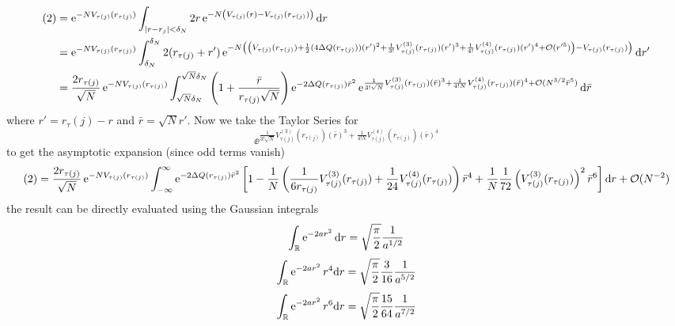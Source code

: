 \begin{align}
  (2) & = \operatorname{e}^{-N V_{\tau(j)}(r_{\tau(j)})} \int_{|r - r_j| < \delta_N} 2r \operatorname{e}^{-N \left( V_{\tau(j)}(r) - V_{\tau(j)}(r_{\tau(j)}) \right)} \mathrm{d} r \\
	& =  \operatorname{e}^{-N V_{\tau(j)}(r_{\tau(j)})} \int_{\delta_N}^{\delta_N} 2(r_{\tau(j)} + r') \operatorname{e}^{-N \left( \left(V_{\tau(j)}(r_{\tau(j)}) + \frac{1}{2}(4 \Delta Q(r_{\tau(j)})) (r')^2 + \frac{1}{3!} V^{(3)}_{\tau(j)}(r_{\tau(j)}) (r')^3 + \frac{1}{4!} V^{(4)}_{\tau(j)}(r_{\tau(j)}) (r')^4 + \mathcal{O}(r'^5) \right) - V_{\tau(j)}(r_{\tau(j)}) \right)} \mathrm{d} r' \\
	&  = \frac{2 r_{\tau(j)}}{\sqrt{N}} \operatorname{e}^{-N V_{\tau(j)}(r_{\tau(j)})} \int_{\sqrt{N} \delta_N}^{\sqrt{N}\delta_N}\left(1 + \frac{\bar{r}}{r_{\tau(j)} \sqrt{N}}\right) \operatorname{e}^{-2\Delta Q(r_{\tau(j)}) \bar{r}^2} \operatorname{e}^{\frac{1}{3! \sqrt{N}} V^{(3)}_{\tau(j)}(r_{\tau(j)}) (\bar{r})^3 + \frac{1}{4! N} V^{(4)}_{\tau(j)}(r_{\tau(j)}) (\bar{r})^4 + \mathcal{O}(N^{3/2} \bar{r}^5)} \mathrm{d} \bar{r}
\end{align}
where $r' = r_\tau(j) - r$ and $\bar{r} =  \sqrt{N}r'$. Now we take the Taylor Series for 
\begin{equation}
	\ee^{\frac{1}{3! \sqrt{N}} V^{(3)}_{\tau(j)}(r_{\tau(j)}) (\bar{r})^3 + \frac{1}{4! N} V^{(4)}_{\tau(j)}(r_{\tau(j)}) (\bar{r})^4}
\end{equation}
to get the asymptotic expansion (since odd terms vanish)
\begin{equation}
	(2) = \frac{2 r_{\tau(j)}}{\sqrt{N}} \operatorname{e}^{-N V_{\tau(j)}(r_{\tau(j)})} \int_{-\infty}^{\infty} \operatorname{e}^{-2\Delta Q(r_{\tau(j)}) \bar{r}^2} \left[ 1- \frac{1}{N} \left( \frac{1}{6 r_{\tau(j)}} V^{(3)}_{\tau(j)}(r_{\tau(j)}) + \frac{1}{24} V^{(4)}_{\tau(j)}(r_{\tau(j)}) \right) \bar{r}^4 + \frac{1}{N} \frac{1}{72} \left(V^{(3)}_{\tau(j)}(r_{\tau(j)}) \right)^2 \bar{r}^6 \right] \mathrm{d} r + \mathcal{O}(N^{-2})
\end{equation}
the result can be directly evaluated using the Gaussian integrals
\begin{equation}
	\int_{\mathbb{R}} \operatorname{e}^{-2ar^2} \mathrm{d} r = \sqrt{\frac{\pi}{2}} \frac{1}{a^{1/2}}
\end{equation}
\begin{equation}
	\int_{\mathbb{R}} \operatorname{e}^{-2ar^2} r^4 \mathrm{d} r = \sqrt{\frac{\pi}{2}} \frac{3}{16} \frac{1}{a^{5/2}}
\end{equation}
\begin{equation}
	\int_{\mathbb{R}} \operatorname{e}^{-2ar^2} r^6 \mathrm{d} r = \sqrt{\frac{\pi}{2}} \frac{15}{64} \frac{1}{a^{7/2}}
\end{equation}

